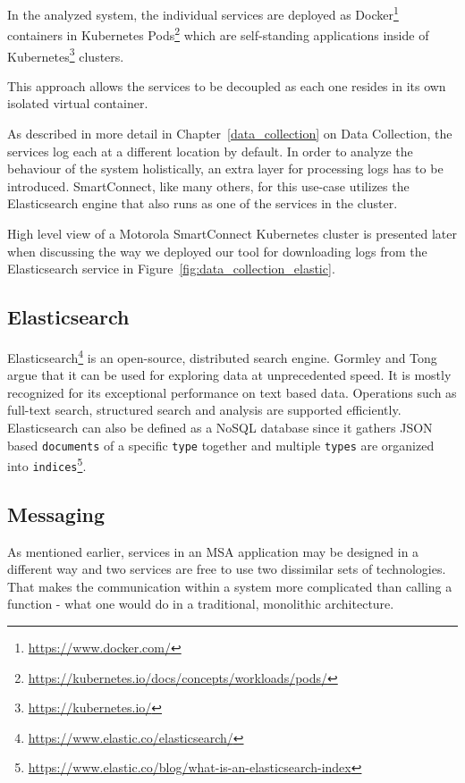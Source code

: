In the analyzed system, the individual services are deployed as Docker\footnote{\url{https://www.docker.com/}} containers in Kubernetes Pods\footnote{\url{https://kubernetes.io/docs/concepts/workloads/pods/}} which are self-standing applications inside of Kubernetes\footnote{\url{https://kubernetes.io/}} clusters.

This approach allows the services to be decoupled as each one resides in its own isolated virtual container.

As described in more detail in Chapter~\ref{data_collection} on Data Collection, the services log each at a different location by default. 
In order to analyze the behaviour of the system holistically, an extra layer for processing logs has to be introduced. SmartConnect, like many others, for this use-case utilizes the Elasticsearch engine that also runs as one of the services in the cluster.

High level view of a Motorola SmartConnect Kubernetes cluster is presented later when discussing the way we deployed our tool for downloading logs from the Elasticsearch service in Figure~\ref{fig:data_collection_elastic}.


\subsection{Elasticsearch}
\label{smart-connect:elastic-search}
Elasticsearch\footnote{\url{https://www.elastic.co/elasticsearch/}} is an open-source, distributed search engine. Gormley and Tong \cite{gormley2015elasticsearch} argue that it can be used for exploring data at unprecedented speed. It is mostly recognized for its exceptional performance on text based data. Operations such as full-text search, structured search and analysis are supported efficiently.
Elasticsearch can also be defined as a NoSQL database since it gathers JSON based \texttt{documents} of a specific \texttt{type} together and multiple \texttt{types} are organized into \texttt{indices}\footnote{\url{https://www.elastic.co/blog/what-is-an-elasticsearch-index}}. 

\subsection{Messaging}
\label{architecture:messaging}
As mentioned earlier, services in an MSA application may be designed in a different way and two services are free to use two dissimilar sets of technologies. That makes the communication within a system more complicated than calling a function - what one would do in a traditional, monolithic architecture.

